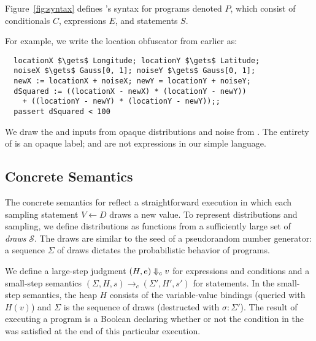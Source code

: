 Figure~\ref{fig:syntax} defines \corelang's syntax for programs denoted
$P$, which consist of conditionals $C$, expressions $E$, and
statements $S$.
\begin{mainonly}
For example, we write the
location obfuscator from earlier as:
%
\begin{lstlisting}
  locationX $\gets$ Longitude; locationY $\gets$ Latitude;
  noiseX $\gets$ Gauss[0, 1]; noiseY $\gets$ Gauss[0, 1];
  newX := locationX + noiseX; newY = locationY + noiseY;
  dSquared := ((locationX - newX) * (locationY - newY))
    + ((locationY - newY) * (locationY - newY));;
  passert dSquared < 100
\end{lstlisting}
%
We draw the  and  inputs from opaque
distributions and noise from .
The entirety of  is an opaque label;  and  are not
expressions in our simple language.
\end{mainonly}

\subsection{Concrete Semantics}

The concrete semantics for \corelang reflect a straightforward
execution in which each sampling statement $V \leftarrow D$ draws a
new value.  To represent distributions and sampling, we define
distributions as functions from a sufficiently large set of
\emph{draws} $\mathcal{S}$. The draws are similar to the seed of a
pseudorandom number generator: a sequence $\Sigma$ of draws dictates
the probabilistic behavior of \corelang programs.

We define a large-step judgment $(H, e) \Downarrow_c v$ for expressions
and conditions and a small-step semantics $(\Sigma, H, s) \to_c
(\Sigma', H', s')$ for statements. In the small-step semantics, the
heap $H$ consists of the variable-value bindings (queried with $H(v)$)
and $\Sigma$ is the sequence of draws (destructed with
$\sigma:\Sigma'$).  The result of executing a program is a Boolean
declaring whether or not the condition in the \passert was satisfied
at the end of this particular execution.

